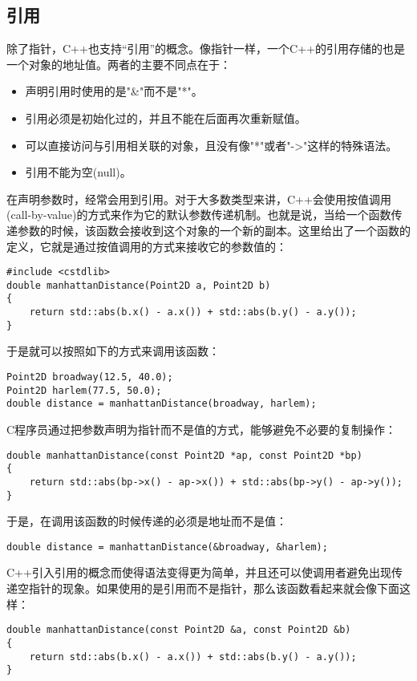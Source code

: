 \documentclass[11pt,oneside]{book}
\begin{document}
\begin{common-format}
\subsection{引用}
除了指针，C++也支持“引用”的概念。像指针一样，一个C++的引用存储的也是一个对象的地址值。两者的主要不同点在于：
\begin{itemize}
\item 声明引用时使用的是"\&{}"而不是"*"。
\item 引用必须是初始化过的，并且不能在后面再次重新赋值。
\item 可以直接访问与引用相关联的对象，且没有像"*"或者"->"这样的特殊语法。
\item 引用不能为空(null)。  
\end{itemize}

在声明参数时，经常会用到引用。对于大多数类型来讲，C++会使用按值调用(call-by-value)的方式来作为它的默认参数传递机制。也就是说，当给一个函数传递参数的时候，该函数会接收到这个对象的一个新的副本。这里给出了一个函数的定义，它就是通过按值调用的方式来接收它的参数值的：

\begin{Verbatim}
#include <cstdlib>
double manhattanDistance(Point2D a, Point2D b)
{
    return std::abs(b.x() - a.x()) + std::abs(b.y() - a.y());
}
\end{Verbatim}

于是就可以按照如下的方式来调用该函数：
\begin{Verbatim}
Point2D broadway(12.5, 40.0);
Point2D harlem(77.5, 50.0);
double distance = manhattanDistance(broadway, harlem);
\end{Verbatim}

C程序员通过把参数声明为指针而不是值的方式，能够避免不必要的复制操作：
\begin{Verbatim}
double manhattanDistance(const Point2D *ap, const Point2D *bp)
{
    return std::abs(bp->x() - ap->x()) + std::abs(bp->y() - ap->y());
}
\end{Verbatim}

于是，在调用该函数的时候传递的必须是地址而不是值：
\begin{Verbatim}
double distance = manhattanDistance(&broadway, &harlem);
\end{Verbatim}

C++引入引用的概念而使得语法变得更为简单，并且还可以使调用者避免出现传递空指针的现象。如果使用的是引用而不是指针，那么该函数看起来就会像下面这样：
\begin{Verbatim}
double manhattanDistance(const Point2D &a, const Point2D &b)
{
    return std::abs(b.x() - a.x()) + std::abs(b.y() - a.y());
}
\end{Verbatim}


\end{common-format}
\end{document}
